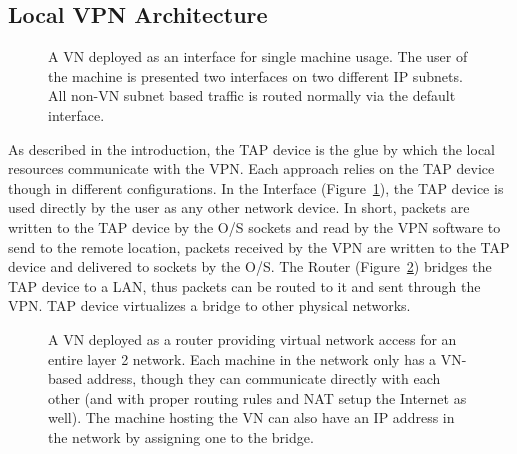 \subsection{Local VPN Architecture}

\begin{figure}
\centering
{}
\caption[VN Interface]{A VN deployed as an interface for single machine usage.
The user of the machine is presented two interfaces on two different IP subnets.
All non-VN subnet based traffic is routed normally via the default interface.}
\label{fig:interface}
\end{figure}

As described in the introduction, the TAP device is the glue by which the local
resources communicate with the VPN.  Each approach relies on the TAP device
though in different configurations.  In the Interface
(Figure~\ref{fig:interface}), the TAP device is used directly by the user as
any other network device.  In short, packets are written to the TAP device by
the O/S sockets and read by the VPN software to send to the remote location,
packets received by the VPN are written to the TAP device and delivered to
sockets by the O/S.  The Router (Figure~\ref{fig:router}) bridges the TAP
device to a LAN, thus packets can be routed to it and sent through the VPN.
TAP device virtualizes a bridge to other physical networks.  

\begin{figure}
\centering
{}
\caption[VN Router]{A VN deployed as a router providing virtual network access
for an entire layer 2 network.  Each machine in the network only has a VN-based
address, though they can communicate directly with each other (and with proper
routing rules and NAT setup the Internet as well).  The machine hosting the VN
can also have an IP address in the network by assigning one to the bridge.}
\label{fig:router}
\end{figure}

